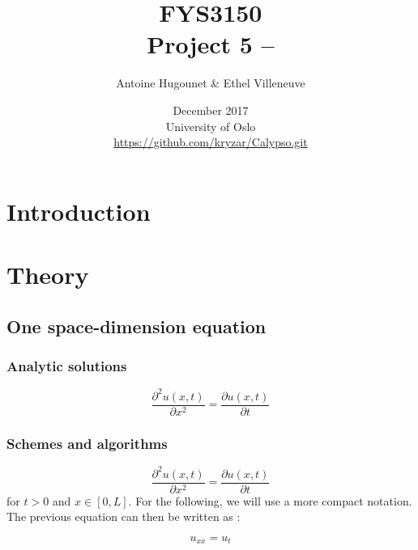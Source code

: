 \documentclass[a4paper, twoside, 11pt]{report}
\title{FYS3150\\Project 5 -- }
\author{Antoine Hugounet \& Ethel Villeneuve}
\date{December 2017 \\University of Oslo \\ \url{https://github.com/kryzar/Calypso.git}}
\theoremstyle{theorem}
\theoremstyle{remark}
\theoremstyle{exemple}
\begin{document}
\maketitle


\begin{abstract}



\end{abstract}


\tableofcontents


\chapter*{Introduction}


\chapter{Theory}

    \section{One space-dimension equation}

        \subsection{Analytic solutions}

            \begin{equation*}
                \frac{\partial^2u(x,t)}{\partial x^2}=\frac{\partial u(x,t)}{\partial t}
                \tag{1}
            \end{equation*}

        \subsection{Schemes and algorithms}

            \begin{equation*}
                \frac{\partial^2u(x,t)}{\partial x^2}=\frac{\partial u(x,t)}{\partial t}
                \tag{1}
            \end{equation*}
            for $t>0$ and $x\in[0,L]$. For the following, we will use a more compact notation. The previous equation can then be written as :

            \begin{equation*}
                u_{xx}=u_t
                \tag{1'}
            \end{equation*}
\end{document}

